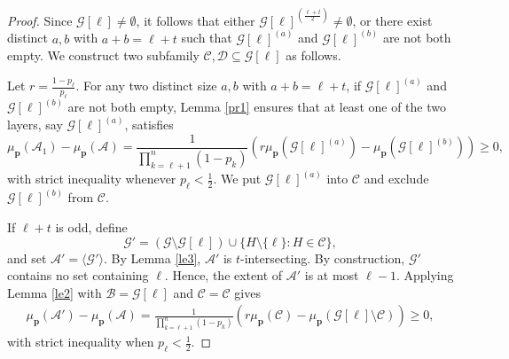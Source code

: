 \documentclass[11pt]{article}
\begin{document}
\begin{proof}
 Since $\mathcal{G}[\ell]\neq \emptyset$, it follows that either $\mathcal{G}[\ell]^{(\frac{\ell+t}{2})}\neq\emptyset$, or
there exist distinct $a,b$ with $a+b=\ell+t$ such that $\mathcal{G}[\ell]^{(a)}$ and $\mathcal{G}[\ell]^{(b)}$  are not both empty.
We construct two subfamily $\mathcal{C}, \mathcal{D}\subseteq\mathcal{G}[\ell]$ as follows. 

Let $r=\frac{1-p_{\ell}}{p_{\ell}}$.
For any two distinct size $a, b$ with $a+b=\ell+t$, if $\mathcal{G}[\ell]^{(a)}$ and $\mathcal{G}[\ell]^{(b)}$ are not both empty, Lemma \ref{pr1} ensures that at least one of the two layers, say $\mathcal{G}[\ell]^{(a)}$, satisfies
$$
\mu_{\mathbf{p}}(\mathcal{A}_1)-\mu_{\mathbf{p}}(\mathcal{A})
=
\frac{1}{\prod_{k=\ell+1}^n(1-p_k)}
\left(
r\mu_{\mathbf{p}}\left(\mathcal{G}[\ell]^{(a)}\right)
-\mu_{\mathbf{p}}\left(\mathcal{G}[\ell]^{(b)}\right)
\right)\geq 0,
$$
with strict inequality  whenever $p_{\ell}<\frac{1}{2}$. We put $\mathcal{G}[\ell]^{(a)}$ into $\mathcal{C}$ and exclude $\mathcal{G}[\ell]^{(b)}$ from $\mathcal{C}$.

If $\ell+t$ is odd,  define
$$
\mathcal{G}'=(\mathcal{G}\setminus\mathcal{G}[\ell])\cup\{H\setminus\{\ell\}: H\in\mathcal{C}\},
$$
and set $\mathcal{A}'=\langle\mathcal{G}'\rangle$.
By Lemma \ref{le3}, $\mathcal{A}'$ is $t$-intersecting. By construction, $\mathcal{G}'$ contains no set containing $\ell$. Hence, the extent of $\mathcal{A}'$ is at most $\ell-1$.
Applying Lemma \ref{le2} with $\mathcal{B}=\mathcal{G}[\ell]$ and $\mathcal{C}=\mathcal{C}$ gives
\begin{align*}
\mu_{\mathbf{p}}(\mathcal{A}')-\mu_{\mathbf{p}}(\mathcal{A})
=
\frac{1}{\prod_{k=\ell+1}^n(1-p_k)}
\left(
r\mu_{\mathbf{p}}(\mathcal{C})
-
\mu_{\mathbf{p}}(\mathcal{G}[\ell]\setminus\mathcal{C})
\right)\geq 0,
\end{align*}
with strict inequality when $p_{\ell}<\frac{1}{2}$. 





\end{proof}
\end{document}
